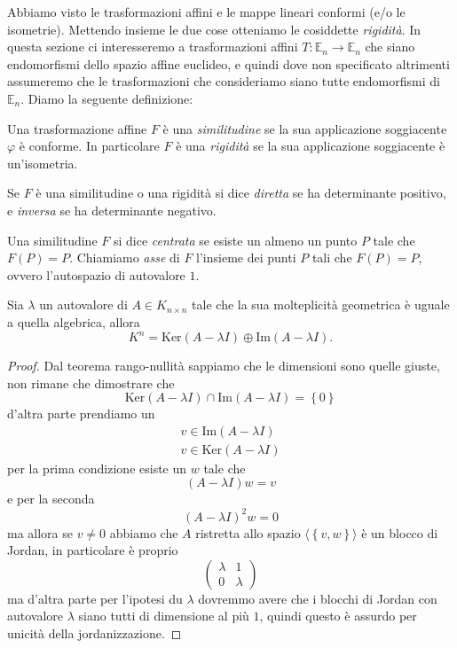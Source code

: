 \documentclass[11pt]{scrartcl}
\newcommand{\Immagine}[1]{\text{Im}\left(#1\right)}
\renewcommand{\ker}[1]{\text{Ker}\left(#1\right)}
\begin{document}
   	 Abbiamo visto le trasformazioni affini e le mappe lineari conformi (e/o le isometrie). Mettendo insieme le due cose otteniamo le cosiddette \textit{rigidità}. In questa sezione ci interesseremo a trasformazioni affini $T:\mathbb{E}_n\to\mathbb{E}_n$ che siano endomorfismi dello spazio affine euclideo, e quindi dove non specificato altrimenti assumeremo che le trasformazioni che consideriamo siano tutte endomorfismi di $\mathbb{E}_n$. Diamo la seguente definizione:
   	 \begin{definition}
   	 	Una trasformazione affine $F$ è una \textit{similitudine} se la sua applicazione soggiacente $\varphi$ è conforme. In particolare $F$ è una \textit{rigidità} se la sua applicazione soggiacente è un'isometria.
   	 \end{definition}
   	 \begin{definition}
   	 	Se $F$ è una similitudine o una rigidità si dice \textit{diretta} se ha determinante positivo, e \textit{inversa} se ha determinante negativo.
   	 \end{definition}
   	 \begin{definition}
   	 	Una similitudine $F$ si dice \textit{centrata} se esiste un almeno un punto $P$ tale che $F(P)=P$. Chiamiamo \textit{asse} di $F$ l'insieme dei punti $P$ tali che $F(P)=P$, ovvero l'autospazio di autovalore $1$.
   	 \end{definition}
   	 \begin{lemma}
   	 	Sia $\lambda$ un autovalore di $A\in K_{n\times n}$ tale che la sua molteplicità geometrica è uguale a quella algebrica, allora
   	 	$$K^n=\ker{A-\lambda I}\oplus \Immagine{A-\lambda I}.$$
   	 \end{lemma}
   	 \begin{proof}
   	 	Dal teorema rango-nullità sappiamo che le dimensioni sono quelle giuste, non rimane che dimostrare che
   	 	$$\ker{A-\lambda I}\cap \Immagine{A-\lambda I}=\left\{0\right\}$$
   	 	d'altra parte prendiamo un 
   	 	\begin{gather*}
   	 		v\in \Immagine{A-\lambda I } \\
   	 		v\in \ker{A-\lambda I}
   	 	\end{gather*}
   	 	per la prima condizione esiste un $w$ tale che
   	 	$$\left(A-\lambda I\right)w=v$$
   	 	e per la seconda
   	 	$$\left(A-\lambda I\right)^2w=0$$
   	 	ma allora se $v\ne 0$ abbiamo che $A$ ristretta allo spazio $\langle \left\{v,w\right\} \rangle$ è un blocco di Jordan, in particolare è proprio
   	 	$$\begin{pmatrix}
   	 		\lambda & 1 \\
   	 		0 & \lambda
   	 	\end{pmatrix}$$
   	 	ma d'altra parte per l'ipotesi du $\lambda$ dovremmo avere che i blocchi di Jordan con autovalore $\lambda$ siano tutti di dimensione al più $1$, quindi questo è assurdo per unicità della jordanizzazione.
   	 \end{proof}
\end{document}
